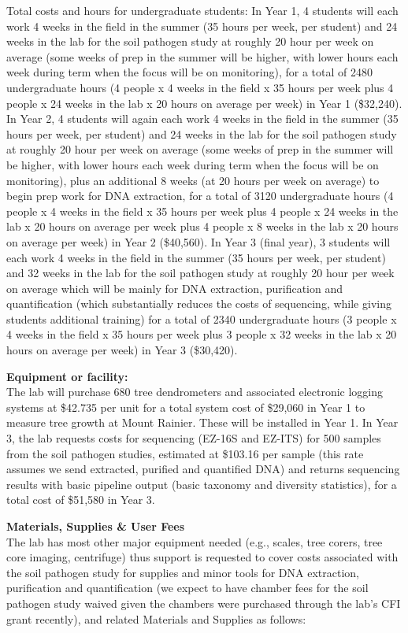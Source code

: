 \documentclass[12pt,oneside]{article}
\begin{document}
Total costs and hours for undergraduate students: In Year 1, 4 students will each work 4 weeks in the field in the summer  (35 hours per week, per student) and 24 weeks in the lab for the soil pathogen study at roughly 20 hour per week on average (some weeks of prep in the summer will be higher, with lower hours each week during term when the focus will be on monitoring), for a total of 2480 undergraduate hours (4 people x 4 weeks in the field x 35 hours per week plus 4 people x 24 weeks in the lab x 20 hours on average per week) in Year 1 (\$32,240). In Year 2, 4 students will again each work 4 weeks in the field in the summer  (35 hours per week, per student) and 24 weeks in the lab for the soil pathogen study at roughly 20 hour per week on average (some weeks of prep in the summer will be higher, with lower hours each week during term when the focus will be on monitoring), plus an additional 8 weeks (at 20 hours per week on average) to begin prep work for DNA extraction, for a total of 3120 undergraduate hours (4 people x 4 weeks in the field x 35 hours per week plus 4 people x 24 weeks in the lab x 20 hours on average per week plus 4 people x 8 weeks in the lab x 20 hours on average per week) in Year 2 (\$40,560). In Year 3 (final year), 3 students will each work 4 weeks in the field in the summer  (35 hours per week, per student) and 32 weeks in the lab for the soil pathogen study at roughly 20 hour per week on average which will be mainly for DNA extraction, purification and quantification (which substantially reduces the costs of sequencing, while giving students additional training) for a total of 2340 undergraduate hours (3 people x 4 weeks in the field x 35 hours per week plus 3 people x 32 weeks in the lab x 20 hours on average per week) in Year 3 (\$30,420). 

{\bf Equipment or facility:}\\
The lab will purchase 680 tree dendrometers and associated electronic logging systems at \$42.735 per unit for a total system cost of \$29,060 in Year 1 to measure tree growth at Mount Rainier. These will be installed in Year 1. In Year 3, the lab requests costs for sequencing (EZ-16S and EZ-ITS) for 500 samples from the soil pathogen studies, estimated at \$103.16 per sample (this rate assumes we send extracted, purified and quantified DNA) and returns sequencing results with basic pipeline output (basic taxonomy and diversity statistics), for a total cost of \$51,580 in Year 3.  

{\bf Materials, Supplies \& User Fees}\\
The lab has most other major equipment needed (e.g., scales, tree corers, tree core imaging, centrifuge) thus support is requested to cover costs associated with the soil pathogen study for supplies and minor tools for DNA extraction, purification and quantification (we expect to have chamber fees for the soil pathogen study waived given the chambers were purchased through the lab's CFI grant recently), and related Materials and Supplies as follows:
\end{document}
